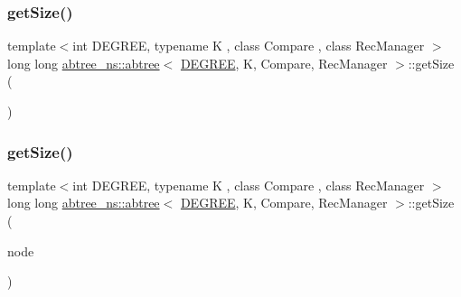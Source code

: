 \mbox{\label{classabtree__ns_1_1abtree_aab64503fd00b60c5badb7bbe492895b1}} 
\subsubsection{\texorpdfstring{get\+Size()}{getSize()}\hspace{0.1cm}{\footnotesize\ttfamily [2/4]}}
{\footnotesize\ttfamily template$<$int D\+E\+G\+R\+EE, typename K , class Compare , class Rec\+Manager $>$ \\
long long \hyperlink{classabtree__ns_1_1abtree}{abtree\+\_\+ns\+::abtree}$<$ \hyperlink{brown__sigouin__abtree__kcas_2adapter_8h_a5d88b17d70c985f2f2b8e987037fd6dd}{D\+E\+G\+R\+EE}, K, Compare, Rec\+Manager $>$\+::get\+Size (\begin{DoxyParamCaption}{ }\end{DoxyParamCaption})\hspace{0.3cm}{\ttfamily [inline]}}

\mbox{\label{classabtree__ns_1_1abtree_a2da603531e2fbd1d4ed0f7dd869b419a}} 
\subsubsection{\texorpdfstring{get\+Size()}{getSize()}\hspace{0.1cm}{\footnotesize\ttfamily [3/4]}}
{\footnotesize\ttfamily template$<$int D\+E\+G\+R\+EE, typename K , class Compare , class Rec\+Manager $>$ \\
long long \hyperlink{classabtree__ns_1_1abtree}{abtree\+\_\+ns\+::abtree}$<$ \hyperlink{brown__sigouin__abtree__kcas_2adapter_8h_a5d88b17d70c985f2f2b8e987037fd6dd}{D\+E\+G\+R\+EE}, K, Compare, Rec\+Manager $>$\+::get\+Size (\begin{DoxyParamCaption}\item[{\hyperlink{structabtree__ns_1_1Node}{Node}$<$ \hyperlink{brown__sigouin__abtree__kcas_2adapter_8h_a5d88b17d70c985f2f2b8e987037fd6dd}{D\+E\+G\+R\+EE}, K $>$ $\ast$}]{node }\end{DoxyParamCaption})\hspace{0.3cm}{\ttfamily [inline]}}

